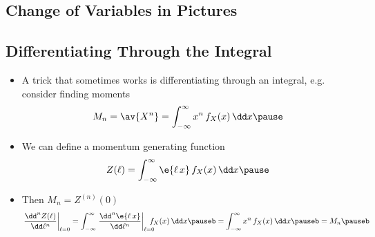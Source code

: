 \begin{slide}
  \section[-2]{Change of Variables in Pictures}

  \pause \pb{}
  \begin{center}
    \pause
  \end{center}
\end{slide}


\begin{slide}
\section[-1]{Differentiating Through the Integral}

\begin{PauseHighLight}
  \begin{itemize}
  \item A trick that sometimes works is differentiating through an
    integral, e.g.{} consider finding moments
    \begin{align*}
      M_n = \av{X^n} = \int_{-\infty}^\infty x^n \, f_X(x) \, \dd x\pause
    \end{align*}
  \item We can define a momentum generating function
    \begin{align*}
      Z(\ell) =  \int_{-\infty}^\infty \e{\ell \, x} \, f_X(x) \, \dd x\pause
    \end{align*}
  \item Then $M_n = Z^{(n)}(0)$
    \begin{align*}
      \left. \frac{\dd^n Z(\ell)}{\dd \ell^n} \right|_{\ell = 0} = 
      \int_{-\infty}^\infty \left. \frac{\dd^n \e{\ell \, x}}{\dd
      \ell^n}  \right|_{\ell = 0}  \hspace{-1em} \, f_X(x) \, \dd x\pauseb
      =  \int_{-\infty}^\infty x^n \, f_X(x) \, \dd x\pauseb = M_n\pauseb
    \end{align*}
  \end{itemize}
\end{PauseHighLight}

\end{slide}


